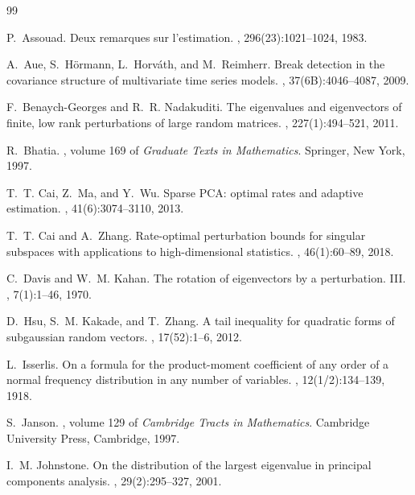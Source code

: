 \documentclass[11pt]{article}
\theoremstyle{tightplain}
\theoremstyle{tightdef}
\begin{document}
\begin{thebibliography}{99}

P.~Assouad.
\newblock Deux remarques sur l'estimation.
, 296(23):1021--1024, 1983.

A.~Aue, S.~H\"ormann, L.~Horv\'ath, and M.~Reimherr.
\newblock Break detection in the covariance structure of multivariate time
series models.
, 37(6B):4046--4087, 2009.

F.~Benaych-Georges and R.~R. Nadakuditi.
\newblock The eigenvalues and eigenvectors of finite, low rank perturbations of
large random matrices.
, 227(1):494--521, 2011.

R.~Bhatia.
, volume 169 of {\em Graduate Texts in
Mathematics}.
\newblock Springer, New York, 1997.

T.~T. Cai, Z.~Ma, and Y.~Wu.
\newblock Sparse {PCA}: optimal rates and adaptive estimation.
, 41(6):3074--3110, 2013.

T.~T. Cai and A.~Zhang.
\newblock Rate-optimal perturbation bounds for singular subspaces with
applications to high-dimensional statistics.
, 46(1):60--89, 2018.

C.~Davis and W.~M. Kahan.
\newblock The rotation of eigenvectors by a perturbation. {III}.
, 7(1):1--46, 1970.

D.~Hsu, S.~M. Kakade, and T.~Zhang.
\newblock A tail inequality for quadratic forms of subgaussian random vectors.
, 17(52):1--6, 2012.

L.~Isserlis.
\newblock On a formula for the product-moment coefficient of any order of a
normal frequency distribution in any number of variables.
, 12(1/2):134--139, 1918.

S.~Janson.
, volume 129 of {\em Cambridge Tracts in
Mathematics}.
\newblock Cambridge University Press, Cambridge, 1997.

I.~M. Johnstone.
\newblock On the distribution of the largest eigenvalue in principal components
analysis.
, 29(2):295--327, 2001.


\end{thebibliography}
\end{document}
